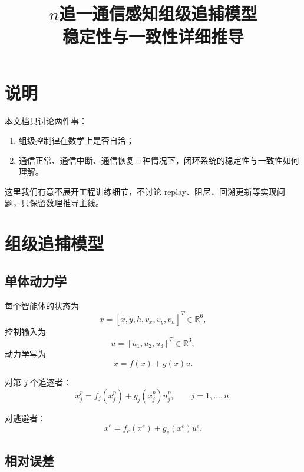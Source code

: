 \documentclass[12pt,a4paper]{ctexart}
\title{$n$追一通信感知组级追捕模型\\稳定性与一致性详细推导}
\author{}
\date{}
\begin{document}
\maketitle

\tableofcontents

\section{说明}

本文档只讨论两件事：
\begin{enumerate}[label=\arabic*)]
    \item 组级控制律在数学上是否自洽；
    \item 通信正常、通信中断、通信恢复三种情况下，闭环系统的稳定性与一致性如何理解。
\end{enumerate}

这里我们有意不展开工程训练细节，不讨论 replay、阻尼、回溯更新等实现问题，只保留数理推导主线。

\section{组级追捕模型}

\subsection{单体动力学}

每个智能体的状态为
\begin{equation}
x=[x,y,h,v_x,v_y,v_h]^T\in\mathbb{R}^6,
\end{equation}
控制输入为
\begin{equation}
u=[u_1,u_2,u_3]^T\in\mathbb{R}^3,
\end{equation}
动力学写为
\begin{equation}
\dot x = f(x)+g(x)u.
\end{equation}

对第 $j$ 个追逐者：
\begin{equation}
\dot x_j^p = f_j(x_j^p)+g_j(x_j^p)u_j^p,\qquad j=1,\dots,n.
\end{equation}

对逃避者：
\begin{equation}
\dot x^e = f_e(x^e)+g_e(x^e)u^e.
\end{equation}

\subsection{相对误差}
\end{document}

